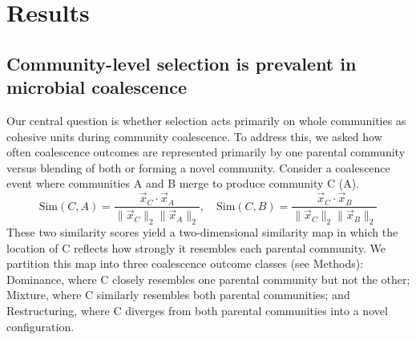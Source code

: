 \section{Results}
\label{sec:results}



\subsection{Community-level selection is prevalent in microbial coalescence}
\label{sec:results:dominance_prevalent}

Our central question is whether selection acts primarily on whole communities as cohesive units during community coalescence. To address this, we asked how often coalescence outcomes are represented primarily by one parental community versus blending of both or forming a novel community. Consider a coalescence event where communities A and B merge to produce community C (A). 
\begin{equation}
\text{Sim}(C, A) = \frac{\vec{x}_C \cdot \vec{x}_A}{\|\vec{x}_C\|_2 \|\vec{x}_A\|_2}, \quad \text{Sim}(C, B) = \frac{\vec{x}_C \cdot \vec{x}_B}{\|\vec{x}_C\|_2 \|\vec{x}_B\|_2}
\label{eq:similarity}
\end{equation}
 These two similarity scores yield a two-dimensional similarity map in which the location of C reflects how strongly it resembles each parental community. We partition this map into three coalescence outcome classes (see Methods): Dominance, where C closely resembles one parental community but not the other; Mixture, where C similarly resembles both parental communities; and Restructuring, where C diverges from both parental communities into a novel configuration.  

